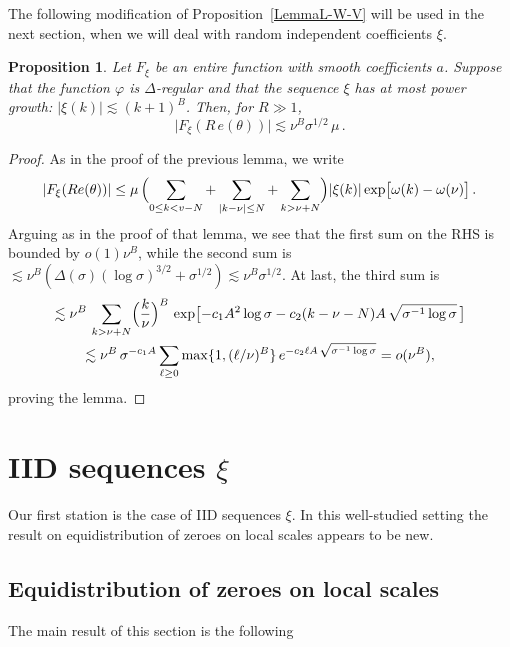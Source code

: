 \documentclass[11pt]{amsart}
\numberwithin{equation}{section}
\newtheorem{proposition}{Proposition}
\begin{document}
The following modification of Proposition~\ref{LemmaL-W-V} will be used in the next section,
when we will deal with random independent coefficients $\xi$.

\begin{proposition}\label{Lemma-L-W-V-upper}
Let $F_\xi$ be an entire function with smooth coefficients $a$.
Suppose that the function $\varphi$ is $\Delta$-regular and
that the sequence
$\xi$ has at most power growth: $|\xi (k)| \lesssim (k+1)^B$.
Then, for  $R\gg 1$,
\[
\bigl| F_\xi (R\,e(\theta)) \bigr| \lesssim \nu^{B}\sigma^{1/2}\, \mu\,.
\]
\end{proposition}

\begin{proof}
As in the proof of the previous lemma, we write
\[
|F_\xi (Re(\theta))|  \le \mu\, \Bigl(
\sum_{0\le k < v-N} + \sum_{|k-\nu|\le N} + \sum_{k>\nu+N}
\Bigr) |\xi (k)| \exp\bigl[ \omega(k)-\omega(\nu) \bigr]\,.
\]
Arguing as in the proof of that lemma, we see that the first sum on the RHS is bounded by $o(1)\nu^B$, while the second sum is
$\lesssim \nu^B(\Delta(\sigma)(\log\sigma)^{3/2} + \sigma^{1/2}) \lesssim \nu^B \sigma^{1/2}$.
At last, the third sum is
\begin{multline*}
\lesssim \nu^B\, \sum_{k>\nu+N} \Bigl( \frac{k}\nu \Bigr)^B\,
\exp\bigl[ -  c_1 A^2\log\sigma - c_2 (k-\nu - N) A\, \sqrt{\sigma^{-1}\log\sigma}\,  \bigr] \\
\lesssim \nu^B\, \sigma^{-c_1 A} \sum_{\ell\ge 0} \max\{1, (\ell/\nu)^B \}\,
e^{-c_2 \ell A\, \sqrt{\sigma^{-1}\log\sigma}}
= o(\nu^B),
\end{multline*}
proving the lemma.
\end{proof}


\section{IID sequences $\xi$}\label{sect:5}
Our first station is the case of IID sequences $\xi$. In this well-studied setting
the result on equidistribution of zeroes on local scales appears to be new.


\subsection{Equidistribution of zeroes on local scales}

The main result of this section is the following
\end{document}

